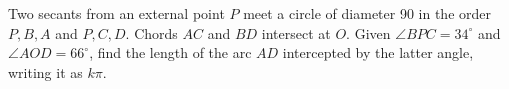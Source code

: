 Two secants from an external point $ P $ meet a circle of diameter 90 in the order $ P,B,A $ and $ P,C,D $. Chords $ AC $ and $ BD $ intersect at $ O $. Given $\angle BPC=34^\circ $ and $\angle AOD=66^\circ $, find the length of the arc $ AD $ intercepted by the latter angle, writing it as $ k\pi $.
